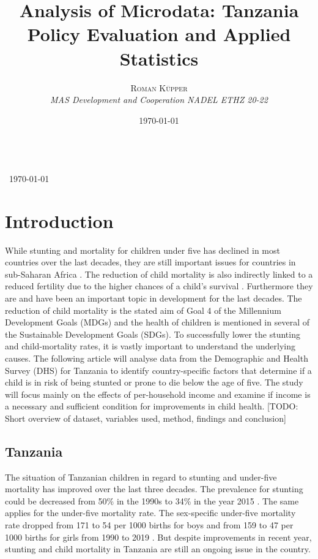 \documentclass[a4paper, 11pt]{article} %
\title{\textbf{Analysis of Microdata: Tanzania}\\ %
Policy Evaluation and Applied Statistics } %
\author{\textsc{Roman Küpper} %
\\{\textit{MAS Development and Cooperation NADEL ETHZ 20-22}}} %
\date{\today} %
\makeatletter
\renewcommand{\maketitle}{ %
\begin{flushright} %
{\LARGE\@title} %
\vspace{50pt} %

{\large\@author} %
\\\ \today %

\vspace{40pt} %
\end{flushright}
}
\makeatother
\begin{document}
\maketitle %



\section{Introduction}
While stunting and mortality for children under five has declined in most countries over the last decades, they are still important issues for countries in sub-Saharan Africa \cite{Nshimyiryo2019Dec}. The reduction of child mortality is also indirectly linked to a reduced fertility due to the higher chances of a child's survival \cite{uddin2009}. Furthermore they are and have been an important topic in development for the last decades. The reduction of child mortality is the stated aim of Goal 4 of the Millennium Development Goals (MDGs) and the health of children is mentioned in several of the Sustainable Development Goals (SDGs). To successfully lower the stunting and child-mortality rates, it is vastly important to understand the underlying causes. The following article will analyse data from the Demographic and Health Survey (DHS) for Tanzania to identify country-specific factors that determine if a child is in risk of being stunted or prone to die below the age of five. The study will focus mainly on the effects of per-household income and examine if income is a necessary and sufficient condition for improvements in child health. [TODO: Short overview of dataset, variables used, method, findings and conclusion]

\subsection*{Tanzania}
The situation of Tanzanian children in regard to stunting and under-five mortality has improved over the last three decades. The prevalence for stunting could be decreased from 50\% in the 1990s to 34\% in the year 2015 \cite{UNI18}. The same applies for the under-five mortality rate. The sex-specific under-five mortality rate dropped from 171 to 54 per 1000 births for boys and from 159 to 47 per 1000 births for girls from 1990 to 2019 \cite{UN20}. But despite improvements in recent year, stunting and child mortality in Tanzania are still an ongoing issue in the country. 
\end{document}
